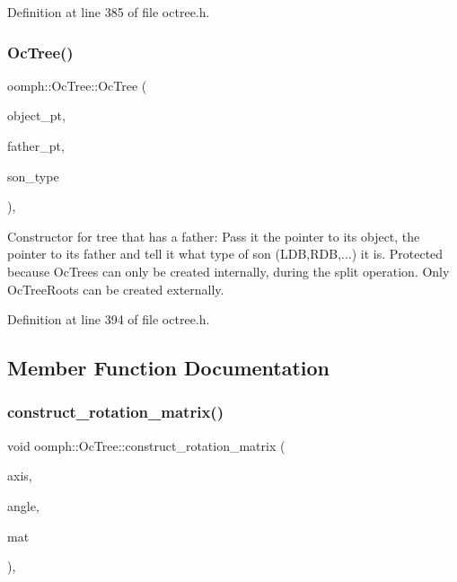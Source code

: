 Definition at line 385 of file octree.\+h.

\mbox{\label{classoomph_1_1OcTree_af79e3cbf9d0c65f9e4a01207d65d4967}} 
\subsubsection{\texorpdfstring{Oc\+Tree()}{OcTree()}\hspace{0.1cm}{\footnotesize\ttfamily [4/4]}}
{\footnotesize\ttfamily oomph\+::\+Oc\+Tree\+::\+Oc\+Tree (\begin{DoxyParamCaption}\item[{\hyperlink{classoomph_1_1RefineableElement}{Refineable\+Element} $\ast$const \&}]{object\+\_\+pt,  }\item[{\hyperlink{classoomph_1_1Tree}{Tree} $\ast$const \&}]{father\+\_\+pt,  }\item[{const int \&}]{son\+\_\+type }\end{DoxyParamCaption})\hspace{0.3cm}{\ttfamily [inline]}, {\ttfamily [protected]}}



Constructor for tree that has a father\+: Pass it the pointer to its object, the pointer to its father and tell it what type of son (L\+DB,R\+DB,...) it is. Protected because Oc\+Trees can only be created internally, during the split operation. Only Oc\+Tree\+Roots can be created externally. 



Definition at line 394 of file octree.\+h.



\subsection{Member Function Documentation}
\mbox{\label{classoomph_1_1OcTree_ad3667015671b5dbc06fdc298c59e4064}} 
\subsubsection{\texorpdfstring{construct\+\_\+rotation\+\_\+matrix()}{construct\_rotation\_matrix()}}
{\footnotesize\ttfamily void oomph\+::\+Oc\+Tree\+::construct\+\_\+rotation\+\_\+matrix (\begin{DoxyParamCaption}\item[{int \&}]{axis,  }\item[{int \&}]{angle,  }\item[{\hyperlink{classoomph_1_1DenseMatrix}{Dense\+Matrix}$<$ int $>$ \&}]{mat }\end{DoxyParamCaption})\hspace{0.3cm}{\ttfamily [static]}, {\ttfamily [private]}}



